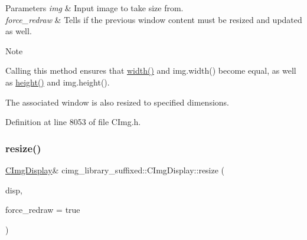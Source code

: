 \begin{DoxyParams}{Parameters}
{\em img} & Input image to take size from. \\
\hline
{\em force\+\_\+redraw} & Tells if the previous window content must be resized and updated as well. \\
\hline
\end{DoxyParams}
\begin{DoxyNote}{Note}

\begin{DoxyItemize}
\item Calling this method ensures that \hyperlink{structcimg__library__suffixed_1_1CImgDisplay_a7b08f09ace9b615eee0ff19846c4b6f8}{width()} and {\ttfamily img.\+width()} become equal, as well as \hyperlink{structcimg__library__suffixed_1_1CImgDisplay_a5604a6886d51d1070ed2ddc568a848f2}{height()} and {\ttfamily img.\+height()}.
\item The associated window is also resized to specified dimensions. 
\end{DoxyItemize}
\end{DoxyNote}


Definition at line 8053 of file C\+Img.\+h.

\mbox{\label{structcimg__library__suffixed_1_1CImgDisplay_a1da38da8b6517995ebd493d6bcca52ca}} 
\subsubsection{\texorpdfstring{resize()}{resize()}\hspace{0.1cm}{\footnotesize\ttfamily [4/4]}}
{\footnotesize\ttfamily \hyperlink{structcimg__library__suffixed_1_1CImgDisplay}{C\+Img\+Display}\& cimg\+\_\+library\+\_\+suffixed\+::\+C\+Img\+Display\+::resize (\begin{DoxyParamCaption}\item[{const \hyperlink{structcimg__library__suffixed_1_1CImgDisplay}{C\+Img\+Display} \&}]{disp,  }\item[{const bool}]{force\+\_\+redraw = {\ttfamily true} }\end{DoxyParamCaption})\hspace{0.3cm}{\ttfamily [inline]}}



